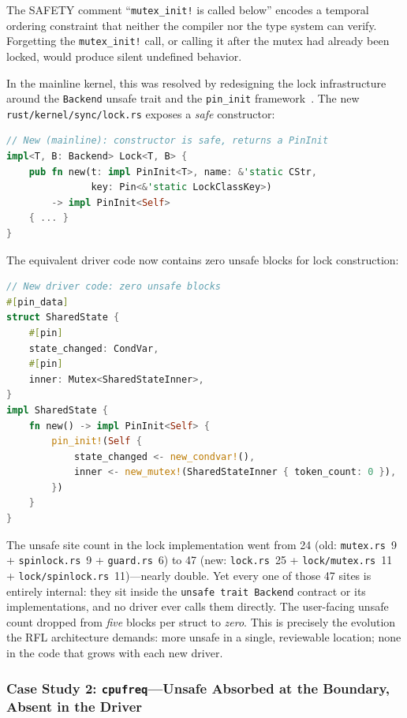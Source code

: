 \noindent The SAFETY comment ``\texttt{mutex\_init!} is called below'' encodes a temporal ordering constraint that neither the compiler nor the type system can verify.
Forgetting the \texttt{mutex\_init!} call, or calling it after the mutex had already been locked, would produce silent undefined behavior.

In the mainline kernel, this was resolved by redesigning the lock infrastructure around the \texttt{Backend} unsafe trait and the \texttt{pin\_init} framework~\cite{TODO:ojeda2022rust}.
The new \texttt{rust/kernel/sync/lock.rs} exposes a \emph{safe} constructor:

\begin{lstlisting}[language=Rust,columns=fullflexible]
// New (mainline): constructor is safe, returns a PinInit
impl<T, B: Backend> Lock<T, B> {
    pub fn new(t: impl PinInit<T>, name: &'static CStr,
               key: Pin<&'static LockClassKey>)
        -> impl PinInit<Self>
    { ... }
}
\end{lstlisting}

\noindent The equivalent driver code now contains zero unsafe blocks for lock construction:

\begin{lstlisting}[language=Rust,columns=fullflexible]
// New driver code: zero unsafe blocks
#[pin_data]
struct SharedState {
    #[pin]
    state_changed: CondVar,
    #[pin]
    inner: Mutex<SharedStateInner>,
}
impl SharedState {
    fn new() -> impl PinInit<Self> {
        pin_init!(Self {
            state_changed <- new_condvar!(),
            inner <- new_mutex!(SharedStateInner { token_count: 0 }),
        })
    }
}
\end{lstlisting}

The unsafe site count in the lock implementation went from 24 (old: \texttt{mutex.rs}~9 + \texttt{spinlock.rs}~9 + \texttt{guard.rs}~6) to 47 (new: \texttt{lock.rs}~25 + \texttt{lock/mutex.rs}~11 + \texttt{lock/spinlock.rs}~11)---nearly double.
Yet every one of those 47 sites is entirely internal: they sit inside the \texttt{unsafe trait Backend} contract or its implementations, and no driver ever calls them directly.
The user-facing unsafe count dropped from \emph{five} blocks per struct to \emph{zero}.
This is precisely the evolution the RFL architecture demands: more unsafe in a single, reviewable location; none in the code that grows with each new driver.

\subsubsection{Case Study 2: \texttt{cpufreq}---Unsafe Absorbed at the Boundary, Absent in the Driver}

